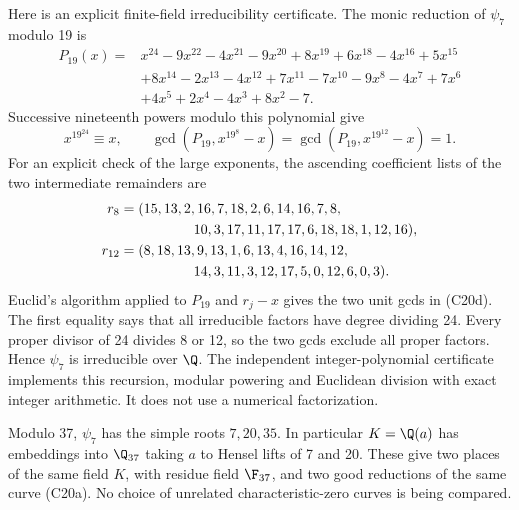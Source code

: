 Here is an explicit finite-field irreducibility certificate.
The monic reduction of $\psi_7$ modulo 19 is
\begin{align*}
 P_{19}(x)={}&x^{24}-9x^{22}-4x^{21}-9x^{20}
       +8x^{19}+6x^{18}-4x^{16}+5x^{15}\\
 &+8x^{14}-2x^{13}-4x^{12}+7x^{11}-7x^{10}
       -9x^8-4x^7+7x^6\\
 &+4x^5+2x^4-4x^3+8x^2-7.
\end{align*}
Successive nineteenth powers modulo this polynomial give
\[
 x^{19^{24}}\equiv x,\qquad
 \gcd(P_{19},x^{19^8}-x)=
 \gcd(P_{19},x^{19^{12}}-x)=1.
 \tag{C20d}
\]
For an explicit check of the large exponents, the ascending
coefficient lists of the two intermediate remainders are
\[
\begin{split}
 r_8={}&(15,13,2,16,7,18,2,6,14,16,7,8,\\
       &\hspace{14mm}10,3,17,11,17,17,6,18,18,1,12,16),\\
 r_{12}={}&(8,18,13,9,13,1,6,13,4,16,14,12,\\
       &\hspace{14mm}14,3,11,3,12,17,5,0,12,6,0,3).
\end{split}
\]
Euclid's algorithm applied to $P_{19}$ and $r_j-x$ gives
the two unit gcds in (C20d). The first equality says that all
irreducible factors have degree dividing 24. Every proper
divisor of 24 divides 8 or 12, so the two gcds exclude all
proper factors. Hence $\psi_7$ is irreducible over $\Q$.
The independent integer-polynomial certificate
 implements this
recursion, modular powering and Euclidean division with exact
integer arithmetic. It does not use a numerical factorization.

Modulo 37, $\psi_7$ has the simple roots $7,20,35$.
In particular $K=\Q(a)$ has embeddings into $\Q_{37}$ taking
$a$ to Hensel lifts of 7 and 20. These give two places of the
same field $K$, with residue field $\F_{37}$, and two good
reductions of the same curve (C20a). No choice of unrelated
characteristic-zero curves is being compared.

